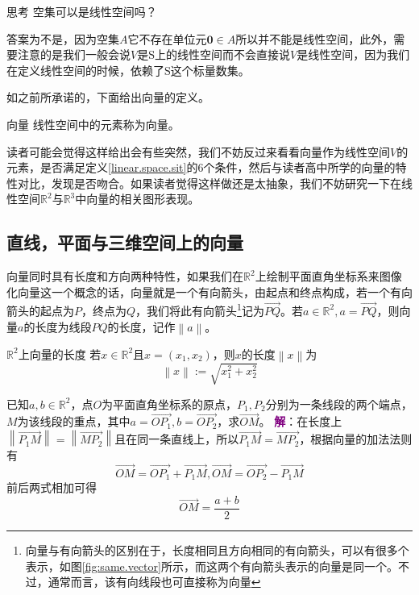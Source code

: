 \begin{ascolorbox1}{思考}
	空集可以是线性空间吗？
\end{ascolorbox1}

答案为不是，因为空集$A$它不存在单位元$\boldsymbol{0}\in A$所以并不能是线性空间，此外，需要注意的是我们一般会说$V$是$\mathrm{S}$上的线性空间而不会直接说$V$是线性空间，因为我们在定义线性空间的时候，依赖了$\mathrm{S}$这个标量数集。

如之前所承诺的，下面给出向量的定义。

\begin{definition}{向量}
	线性空间中的元素称为向量。
\end{definition}

读者可能会觉得这样给出会有些突然，我们不妨反过来看看向量作为线性空间$V$的元素，是否满足定义\ref{linear.space.sit}的6个条件，然后与读者高中所学的向量的特性对比，发现是否吻合。如果读者觉得这样做还是太抽象，我们不妨研究一下在线性空间$\mathbb{R}^2$与$\mathbb{R}^3$中向量的相关图形表现。

\subsection{直线，平面与三维空间上的向量}

向量同时具有长度和方向两种特性，如果我们在$\mathbb{R}^2$上绘制平面直角坐标系来图像化向量这一个概念的话，向量就是一个有向箭头，由起点和终点构成，若一个有向箭头的起点为$P$，终点为$Q$，我们将此有向箭头\footnote{向量与有向箭头的区别在于，长度相同且方向相同的有向箭头，可以有很多个表示，如图\ref{fig:same.vector}所示，而这两个有向箭头表示的向量是同一个。不过，通常而言，该有向线段也可直接称为向量}记为$\overrightarrow{PQ}$。若$a\in \mathbb{R}^2,a=\overrightarrow{PQ}$，则向量$a$的长度为线段$PQ$的长度，记作$\left \| a \right \| $。

\begin{definition}{$\mathbb{R}^2$上向量的长度}
	若$x\in \mathbb{R}^2$且$x=(x_1,x_2)$，则$x$的长度$\left \| x \right \| $为$$\left \| x \right \| := \sqrt{x_1^2+x_2^2}$$
\end{definition}

\begin{example}
	已知$a,b\in \mathbb{R}^2$，点$O$为平面直角坐标系的原点，$P_1,P_2$分别为一条线段的两个端点，$M$为该线段的重点，其中$a=\overrightarrow{OP_1},b=\overrightarrow{OP_2}$，求$\overrightarrow{OM}$。
	\tcblower
	\textcolor{purple}{\textbf{解}}：在长度上$\left \| \overrightarrow{P_1M} \right \|=\left \| \overrightarrow{MP_2} \right \|$且在同一条直线上，所以$\overrightarrow{P_1M}=\overrightarrow{MP_2}$，根据向量的加法法则有$$\overrightarrow{OM}=\overrightarrow{OP_1}+\overrightarrow{P_1M},\overrightarrow{OM}=\overrightarrow{OP_2}-\overrightarrow{P_1M}$$前后两式相加可得$$\overrightarrow{OM}=\frac{a+b}{2}$$
\end{example}

